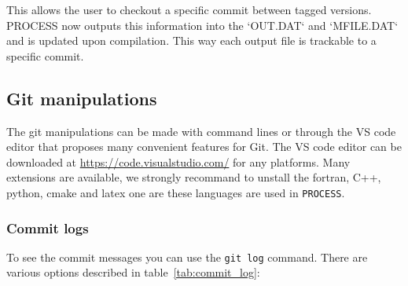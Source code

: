 \documentclass[11pt,a4paper]{report}
\newcommand{\process}{\mbox{\texttt{PROCESS}}}
\begin{document}
This allows the user to checkout a specific commit between tagged versions.
PROCESS now outputs this information into the `OUT.DAT` and `MFILE.DAT` and is
updated upon compilation. This way each output file is trackable to a specific commit.

\subsection{Git manipulations}

The git manipulations can be made with command lines or through the VS code editor that proposes many convenient features for Git. The VS code editor can be downloaded at \url{https://code.visualstudio.com/} for any platforms. Many extensions are available, we strongly recommand to unstall the fortran, C++, python, cmake and latex one are these languages are used in \process.

\subsubsection{Commit logs}
To see the commit messages you can use the \texttt{git log} command. There are various options
described in table~\ref{tab:commit_log}:
\end{document}

